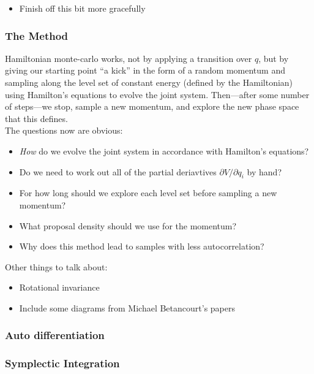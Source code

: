 \documentclass{article}
\begin{document}
\begin{itemize}
  \item Finish off this bit more gracefully
\end{itemize}

\subsubsection{The Method}

Hamiltonian monte-carlo works, not by applying a transition over $q$, but by giving our starting point ``a kick'' in the form of a random momentum and sampling along the level set of constant energy (defined by the Hamiltonian) using Hamilton's equations to evolve the joint system. Then---after some number of steps---we stop, sample a new momentum, and explore the new phase space that this defines. \\

The questions now are obvious:

\begin{itemize}
\item \emph{How} do we evolve the joint system in accordance with Hamilton's equations?
\item Do we need to work out all of the partial deriavtives $\partial V/\partial q_i$ by hand? 
\item For how long should we explore each level set before sampling a new momentum?
\item What proposal density should we use for the momentum?
\item Why does this method lead to samples with less autocorrelation?
\end{itemize}

Other things to talk about:
\begin{itemize}

\item Rotational invariance

\item Include some diagrams from Michael Betancourt's papers

\end{itemize}

\subsubsection{Auto differentiation}

\subsubsection{Symplectic Integration}
\end{document}
